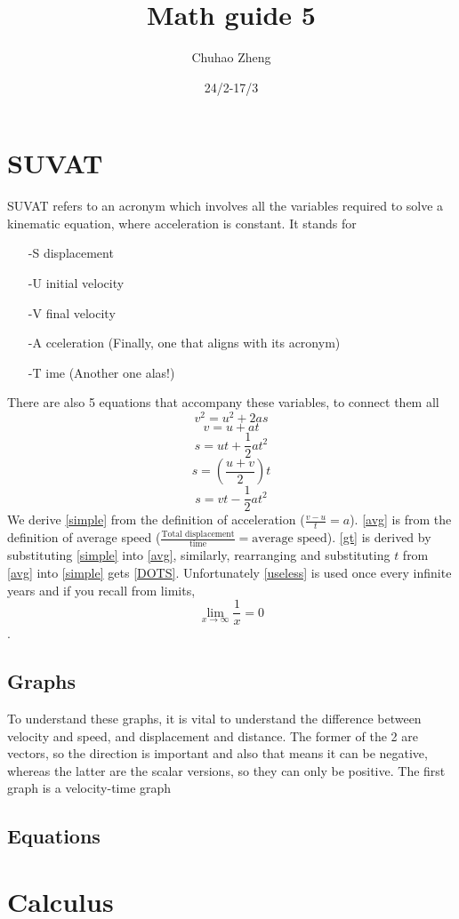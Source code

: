 \documentclass{article}
\title{Math guide 5}
\author{Chuhao Zheng}
\date{24/2-17/3}
\begin{document}
\maketitle
\tableofcontents
\newpage
\section{SUVAT}
{SUVAT refers to an acronym which involves all the variables required to solve a kinematic equation, where acceleration is constant. It stands for}
\begin{itemize}
\item[-S] displacement
\item[-U] initial velocity
\item[-V] final velocity  
\item[-A]cceleration (Finally, one that aligns with its acronym) 
\item[-T]ime (Another one alas!) 
\end{itemize}
{There are also 5 equations that accompany these variables, to connect them all}
\begin{equation}
    \label{DOTS}
    v^{2}=u^{2}+2as
\end{equation}
\begin{equation}
    \label{simple}
    v=u+at
\end{equation}
\begin{equation}
    \label{gt}
    s=ut+\frac{1}{2}at^2
\end{equation}
\begin{equation}
    \label{avg}
    s=\left(\frac{u+v}{2}\right)t
\end{equation}
\begin{equation}
\label{useless}
    s=vt-\frac{1}{2}at^2
\end{equation}
{We derive \ref{simple} from the definition of acceleration ($\frac{v-u}{t}=a$). \ref{avg} is from the definition of average speed ($\frac{\text{Total displacement}}{\text{time}}=\text{average speed}$). \ref{gt} is derived by substituting \ref{simple} into \ref{avg}, similarly, rearranging and substituting $t$ from \ref{avg} into \ref{simple} gets \ref{DOTS}. Unfortunately \ref{useless} is used once every infinite years and if you recall from limits, \[\lim_{x\to\infty} \frac{1}{x} = 0\].}
\newpage
\subsection{Graphs}
{To understand these graphs, it is vital to understand the difference between velocity and speed, and displacement and distance. The former of the 2 are vectors, so the direction is important and also that means it can be negative, whereas the latter are the scalar versions, so they can only be positive.}
{The first graph is a velocity-time graph}
\begin{figure}[h] %
    
\end{figure}
\subsection{Equations}
\section{Calculus}
\end{document}
